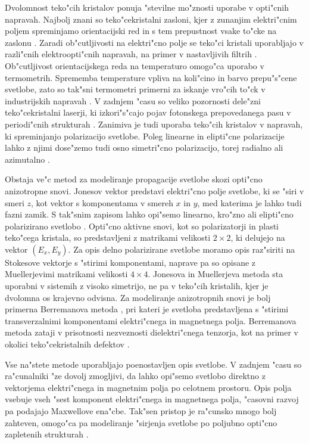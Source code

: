 \documentclass[12pt,twoside,openright,final,a4paper]{report}
\begin{document}
Dvolomnost teko"cih kristalov ponuja "stevilne mo"znosti uporabe v opti"cnih napravah. 
Najbolj znani so teko"cekristalni zasloni, kjer z zunanjim elektri"cnim poljem spreminjamo orientacijski red in s tem prepustnost vsake to"cke na zaslonu \cite{optics-lcd}. 
Zaradi ob"cutljivosti na elektri"cno polje se teko"ci kristali uporabljajo v razli"cnih elektroopti"cnih napravah, na primer v nastavljivih filtrih \cite{filters-sneh}.
Ob"cutljivost orientacijskega reda na temperaturo omogo"ca uporabo v termometrih. 
Sprememba temperature vpliva na koli"cino in barvo prepu"s"cene svetlobe, zato so tak"sni termometri primerni za iskanje vro"cih to"ck v industrijskih napravah \cite{hot-spots}. 
V zadnjem "casu so veliko pozornosti dele"zni teko"cekristalni laserji, ki izkori"s"cajo pojav fotonskega prepovedanega pasu v periodi"cnih strukturah \cite{humar-musevic,coles-morris}. 
Zanimiva je tudi uporaba teko"cih kristalov v napravah, ki spreminjanjo polarizacijo svetlobe. 
Poleg linearne in elipti"cne polarizacije lahko z njimi dose"zemo tudi osno simetri"cno polarizacijo, torej radialno ali azimutalno \cite{polarization-converters-linear,polarization-converters-axial}. 

Obstaja ve"c metod za modeliranje propagacije svetlobe skozi opti"cno anizotropne snovi. 
Jonesov vektor predstavi elektri"cno polje svetlobe, ki se "siri v smeri $z$, kot vektor s komponentama v smereh $x$ in $y$, med katerima je lahko tudi fazni zamik. 
S tak"snim zapisom lahko opi"semo linearno, kro"zno ali elipti"cno polarizirano svetlobo \cite{optics-lcd}. 
Opti"cno aktivne snovi, kot so polarizatorji in plasti teko"cega kristala, so predstavljeni z matrikami velikosti $2\times 2$, ki delujejo na vektor $(E_x, E_y)$. 
Za opis delno polarizirane svetlobe moramo opis raz"siriti na Stokesove vektorje s "stirimi komponentami, naprave pa so opisane z Muellerjevimi matrikami velikosti $4\times 4$.
Jonesova in Muellerjeva metoda sta uporabni v sistemih z visoko simetrijo, ne pa v teko"cih kristalih, kjer je dvolomna os krajevno odvisna. 
Za modeliranje anizotropnih snovi je bolj primerna Berremanova metoda \cite{berreman,stallinga-berreman}, pri kateri je svetloba predstavljena s "stirimi transverzalnimi komponentami elektri"cnega in magnetnega polja. Berremanova metoda zataji v prisotnosti nezveznosti dielektri"cnega tenzorja, kot na primer v okolici teko"cekristalnih defektov \cite{metode-kriezis, hwang-rey}. 

Vse na"stete metode uporabljajo poenostavljen opis svetlobe. 
V zadnjem "casu so ra"cunalniki "ze dovolj zmogljivi, da lahko opi"semo svetlobo direktno z vektorjema elektri"cnega in magnetnim polja po celotnem prostoru. 
Opis polja vsebuje vseh "sest komponent elektri"cnega in magnetnega polja, "casovni razvoj pa podajajo Maxwellove ena"cbe. 
Tak"sen pristop je ra"cunsko mnogo bolj zahteven, omogo"ca pa modeliranje "sirjenja svetlobe po poljubno opti"cno zapletenih strukturah \cite{taflove}. 
\end{document}
